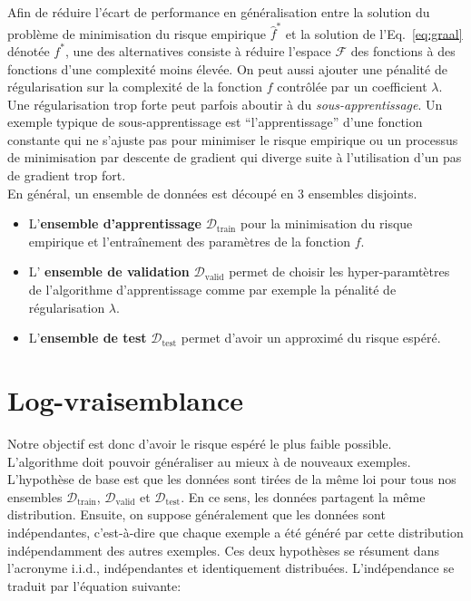 Afin de réduire l'écart de performance en généralisation entre la solution du
problème de minimisation du risque empirique $\hat{f}^*$ et la solution de
l'Eq.~\ref{eq:graal} dénotée $f^*$, une des alternatives consiste à réduire
l'espace $\mathcal{F}$ des fonctions à des fonctions d'une complexité moins
élevée. On peut aussi ajouter une pénalité de régularisation sur la complexité
de la fonction $f$ contrôlée par un coefficient $\lambda$. Une régularisation
trop forte peut parfois aboutir à du \emph{sous-apprentissage}. Un exemple
typique de sous-apprentissage est ``l'apprentissage'' d'une fonction constante
qui ne s'ajuste pas pour minimiser le risque empirique ou un processus de
minimisation par descente de gradient qui diverge suite à l'utilisation d'un
pas de gradient trop fort. \\

En général, un ensemble de données est découpé en $3$ ensembles disjoints.


\begin{itemize}

\item L'{\bf ensemble d'apprentissage} $\mathcal{D}_\textrm{train}$ pour la
minimisation du risque empirique et l'entraînement des paramètres de la
fonction $f$.

\item L' {\bf ensemble de validation} $\mathcal{D_{\mathrm{valid}}}$ permet de
choisir les hyper-paramtètres de l'algorithme d'apprentissage comme par exemple
la pénalité de régularisation $\lambda$.

\item L'{\bf ensemble de test} $\mathcal{D_{\mathrm{test}}}$  permet d'avoir un
approximé du risque espéré.

\end{itemize}

\section{Log-vraisemblance}

Notre objectif est donc d'avoir le risque espéré le plus faible possible.
L'algorithme doit pouvoir généraliser au mieux à de nouveaux exemples.
L'hypothèse de base est que les données sont tirées de la même loi pour tous
nos ensembles $\mathcal{D}_\textrm{train}$, $\mathcal{D_{\mathrm{valid}}}$ et
$\mathcal{D_{\mathrm{test}}}$. En ce sens, les données partagent la même
distribution.  Ensuite, on suppose généralement que les données sont
indépendantes, c'est-à-dire que chaque exemple a été généré par cette
distribution indépendamment des autres exemples.  Ces deux hypothèses
se résument dans l'acronyme i.i.d., indépendantes et identiquement distribuées.
L'indépendance se traduit par l'équation suivante:

